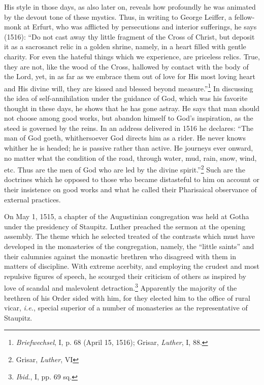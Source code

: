 His style in those days, as also later on, reveals how profoundly
he was animated by the devout tone of these mystics. Thus, in
writing to George Leiffer, a fellow-monk at Erfurt, who was afflicted
by persecutions and interior sufferings, he says (1516): “Do
not cast away thy little fragment of the Cross of Christ, but deposit
it as a sacrosanct relic in a golden shrine, namely, in a heart filled
with gentle charity. For even the hateful things which we experience,
are priceless relics. True, they are not, like the wood of the
Cross, hallowed by contact with the body of the Lord, yet, in as far
as we embrace them out of love for His most loving heart and His
divine will, they are kissed and blessed beyond measure.”\footnote
{\textit{Briefwechsel}, I, p. 68 (April 15, 1516); Grisar, \textit{Luther}, I, 88.}
In discussing the idea of self-annihilation under the guidance of
God, which was his favorite thought in these days, he shows that he
has gone astray. He says that man should not choose among good
works, but abandon himself to God’s inspiration, as the steed is
governed by the reins. In an address delivered in 1516 he declares:
“The man of God goeth, whithersoever God directs him as a rider.
He never knows whither he is headed; he is passive rather than active.
He journeys ever onward, no matter what the condition of the
road, through water, mud, rain, snow, wind, etc. Thus are the men
of God who are led by the divine spirit.”\footnote{Grisar, \textit{Luther}, VI}
Such are the doctrines
which he opposed to those who became distasteful to him on account
or their insistence on good works and what he called their Pharisaical
observance of external practices.

On May 1, 1515, a chapter of the Augustinian congregation was
held at Gotha under the presidency of Staupitz. Luther preached the
sermon at the opening assembly. The theme which he selected
treated of the contrasts which must have developed in the monasteries
of the congregation, namely, the “little saints” and their
calumnies against the monastic brethren who disagreed with them in
matters of discipline. With extreme acerbity, and employing the
crudest and most repulsive figures of speech, he scourged their criticism
of others as inspired by love of scandal and malevolent detraction.\footnote{\textit{Ibid.}, I, pp. 69 sq.}
Apparently the majority of the brethren of his Order sided
with him, for they elected him to the office of rural vicar, \textit{i.e.},
special superior of a number of monasteries as the representative of
Staupitz.

